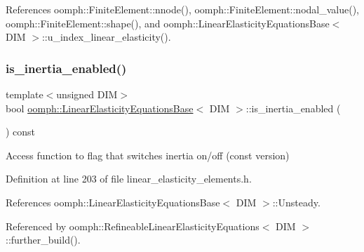 References oomph\+::\+Finite\+Element\+::nnode(), oomph\+::\+Finite\+Element\+::nodal\+\_\+value(), oomph\+::\+Finite\+Element\+::shape(), and oomph\+::\+Linear\+Elasticity\+Equations\+Base$<$ D\+I\+M $>$\+::u\+\_\+index\+\_\+linear\+\_\+elasticity().

\mbox{\label{classoomph_1_1LinearElasticityEquationsBase_aa0ce797b0daf6a28ba90dba764e565f7}} 
\subsubsection{\texorpdfstring{is\+\_\+inertia\+\_\+enabled()}{is\_inertia\_enabled()}}
{\footnotesize\ttfamily template$<$unsigned D\+IM$>$ \\
bool \hyperlink{classoomph_1_1LinearElasticityEquationsBase}{oomph\+::\+Linear\+Elasticity\+Equations\+Base}$<$ D\+IM $>$\+::is\+\_\+inertia\+\_\+enabled (\begin{DoxyParamCaption}{ }\end{DoxyParamCaption}) const\hspace{0.3cm}{\ttfamily [inline]}}



Access function to flag that switches inertia on/off (const version) 



Definition at line 203 of file linear\+\_\+elasticity\+\_\+elements.\+h.



References oomph\+::\+Linear\+Elasticity\+Equations\+Base$<$ D\+I\+M $>$\+::\+Unsteady.



Referenced by oomph\+::\+Refineable\+Linear\+Elasticity\+Equations$<$ D\+I\+M $>$\+::further\+\_\+build().

\mbox{\label{classoomph_1_1LinearElasticityEquationsBase_a2a2ba588a8aee3eb327102fd3c0bbaf0}} 
